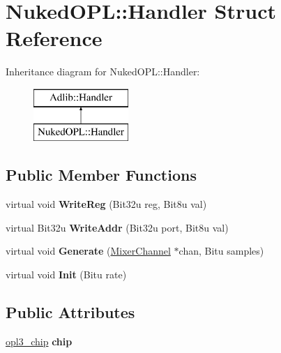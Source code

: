 \hypertarget{structNukedOPL_1_1Handler}{\section{Nuked\-O\-P\-L\-:\-:Handler Struct Reference}
\label{structNukedOPL_1_1Handler}
}
Inheritance diagram for Nuked\-O\-P\-L\-:\-:Handler\-:\begin{figure}[H]
\begin{center}
\leavevmode
\includegraphics[height=2.000000cm]{structNukedOPL_1_1Handler}
\end{center}
\end{figure}
\subsection*{Public Member Functions}
\begin{DoxyCompactItemize}
\item 
\hypertarget{structNukedOPL_1_1Handler_a3eb56c73d0d686f94d3dde610d076701}{virtual void {\bfseries Write\-Reg} (Bit32u reg, Bit8u val)}\label{structNukedOPL_1_1Handler_a3eb56c73d0d686f94d3dde610d076701}

\item 
\hypertarget{structNukedOPL_1_1Handler_a547e26ed696b27870c7c6785d90dfde7}{virtual Bit32u {\bfseries Write\-Addr} (Bit32u port, Bit8u val)}\label{structNukedOPL_1_1Handler_a547e26ed696b27870c7c6785d90dfde7}

\item 
\hypertarget{structNukedOPL_1_1Handler_aa328e6f2071bcb5f65173f3fbe3e2e05}{virtual void {\bfseries Generate} (\hyperlink{classMixerChannel}{Mixer\-Channel} $\ast$chan, Bitu samples)}\label{structNukedOPL_1_1Handler_aa328e6f2071bcb5f65173f3fbe3e2e05}

\item 
\hypertarget{structNukedOPL_1_1Handler_a8d93a0fcd4d17c7f85f5d8a65c0411d0}{virtual void {\bfseries Init} (Bitu rate)}\label{structNukedOPL_1_1Handler_a8d93a0fcd4d17c7f85f5d8a65c0411d0}

\end{DoxyCompactItemize}
\subsection*{Public Attributes}
\begin{DoxyCompactItemize}
\item 
\hypertarget{structNukedOPL_1_1Handler_a9c5310036580811bf25b820f4cc6f5d4}{\hyperlink{structopl3__chip}{opl3\-\_\-chip} {\bfseries chip}}\label{structNukedOPL_1_1Handler_a9c5310036580811bf25b820f4cc6f5d4}

\end{DoxyCompactItemize}


